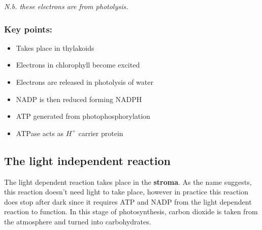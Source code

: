 \documentclass{article}
\begin{document}
\textit{N.b. these electrons are from photolysis.}

\subsubsection*{Key points:}
\begin{itemize}
    \item Takes place in thylakoids
    \item Electrons in chlorophyll become excited
    \item Electrons are released in photolysis of water
    \item NADP is then reduced forming NADPH
    \item ATP generated from photophosphorylation
		\item ATPase acts as $H^+$ carrier protein
\end{itemize}

\newpage
\subsection*{The light independent reaction}
The light dependent reaction takes place in the \textbf{stroma}. As the name
suggests, this reaction doesn't need light to take place, however in practice
this reaction does stop after dark since it requires ATP and NADP from the light
dependent reaction to function. In this stage of photosynthesis, carbon dioxide
is taken from the atmosphere and turned into carbohydrates.
\end{document}
